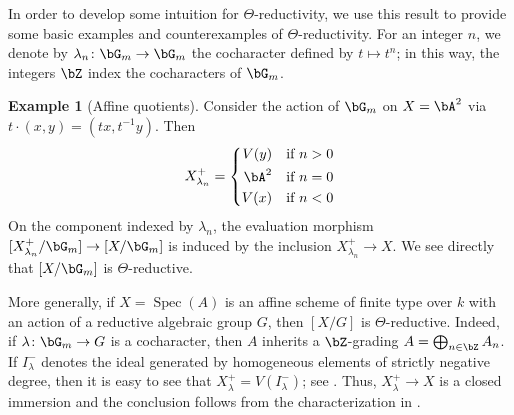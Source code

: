 \documentclass[a4paper]{amsart}
\numberwithin{equation}{section}
\theoremstyle{plain}
\theoremstyle{definition}
\newtheorem{example}[thm]{Example}
\DeclareMathOperator{\Spec}{Spec}
\newcommand{\co}{\colon}
\begin{document}
In order to develop some intuition for $\Theta$-reductivity, we use this result to provide some basic examples and counterexamples of $\Theta$-reductivity.   For an integer $n$, we denote by $\lambda_n \co \bG_m \to \bG_m$ the cocharacter defined by $t \mapsto t^n$; in this way, the integers $\bZ$  index the cocharacters of $\bG_m$.
\begin{example}[Affine quotients] \label{E:A2} Consider the action of $\bG_m$ on $X=\bA^2$ via $t \cdot (x,y) = (tx, t^{-1}y)$.  Then   
 $$ X^+_{\lambda_n} = \left\{ 
\begin{aligned}  
	V(y)		&	& \text{if $n > 0$} \\
	\bA^2	& 	& \text{if $n = 0$}  \\
	V(x)		& 	& \text{if $n < 0$} 
\end{aligned}\right.
$$
On the component indexed by $\lambda_n$, the evaluation morphism $[X^+_{\lambda_n} / \bG_m] \to [X/\bG_m]$ is induced by the inclusion $X^+_{\lambda_n} \to X$.  We see directly that $[X/\bG_m]$ is $\Theta$-reductive.

More generally, if $X = \Spec(A)$ is an affine scheme of finite type over $k$ with an action of a reductive algebraic group $G$, then $[X/G]$ is $\Theta$-reductive.  Indeed, if $\lambda \co \bG_m \to G$ is a cocharacter, then $A$ inherits a $\bZ$-grading $A = \bigoplus_{n \in \bZ} A_n$.  If $I^-_{\lambda}$ denotes the ideal generated by homogeneous elements of strictly negative degree, then it is easy to see that $X^+_{\lambda} = V(I^-_{\lambda})$; see \cite[\S 1.3.4]{drinfeld}.  Thus, $X^+_{\lambda} \to X$ is a closed immersion and the conclusion follows from the characterization in . \end{example}
\end{document}
